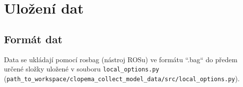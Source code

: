 \documentclass[10pt,a4paper,titlepage,oneside]{report}
\begin{document}

\chapter{Uložení dat}

\section{Formát dat}
Data se ukládají pomocí rosbag (nástroj ROSu) ve formátu “.bag“ do předem určené složky uložené v souboru \verb|local_options.py| (\verb|path_to_workspace/clopema_collect_model_data/src/local_options.py|).
\\
\end{document}
